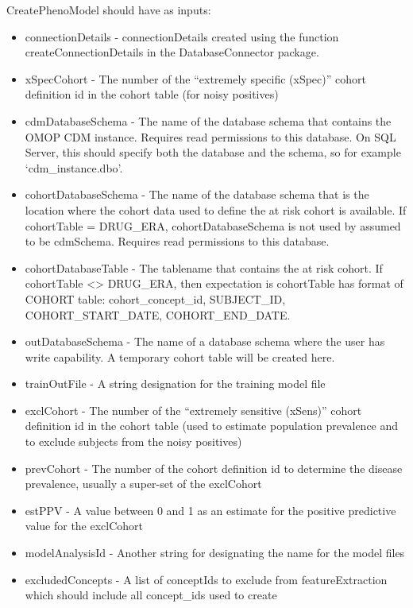 \documentclass[]{article}
\providecommand{\tightlist}{%
  \setlength{\itemsep}{0pt}\setlength{\parskip}{0pt}}
\begin{document}
CreatePhenoModel should have as inputs:

\begin{itemize}
\tightlist
\item
  connectionDetails - connectionDetails created using the function
  createConnectionDetails in the DatabaseConnector package.
\item
  xSpecCohort - The number of the ``extremely specific (xSpec)'' cohort
  definition id in the cohort table (for noisy positives)
\item
  cdmDatabaseSchema - The name of the database schema that contains the
  OMOP CDM instance. Requires read permissions to this database. On SQL
  Server, this should specify both the database and the schema, so for
  example `cdm\_instance.dbo'.
\item
  cohortDatabaseSchema - The name of the database schema that is the
  location where the cohort data used to define the at risk cohort is
  available. If cohortTable = DRUG\_ERA, cohortDatabaseSchema is not
  used by assumed to be cdmSchema. Requires read permissions to this
  database.
\item
  cohortDatabaseTable - The tablename that contains the at risk cohort.
  If cohortTable \textless{}\textgreater{} DRUG\_ERA, then expectation
  is cohortTable has format of COHORT table: cohort\_concept\_id,
  SUBJECT\_ID, COHORT\_START\_DATE, COHORT\_END\_DATE.
\item
  outDatabaseSchema - The name of a database schema where the user has
  write capability. A temporary cohort table will be created here.
\item
  trainOutFile - A string designation for the training model file
\item
  exclCohort - The number of the ``extremely sensitive (xSens)'' cohort
  definition id in the cohort table (used to estimate population
  prevalence and to exclude subjects from the noisy positives)
\item
  prevCohort - The number of the cohort definition id to determine the
  disease prevalence, usually a super-set of the exclCohort
\item
  estPPV - A value between 0 and 1 as an estimate for the positive
  predictive value for the exclCohort
\item
  modelAnalysisId - Another string for designating the name for the
  model files
\item
  excludedConcepts - A list of conceptIds to exclude from
  featureExtraction which should include all concept\_ids used to create

\end{itemize}
\end{document}
